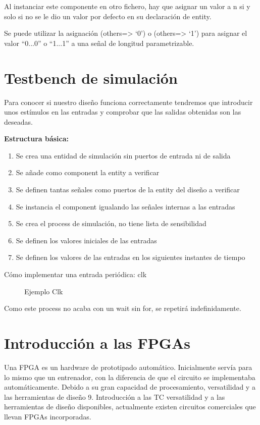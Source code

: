 Al instanciar este componente en otro fichero, hay que asignar un valor a n si y solo si no se le dio un valor por defecto en su declaración de entity.

Se  puede  utilizar  la  asignación (others=> ‘0’) o (others=> ‘1’) para asignar el valor “0...0” o “1...1” a una señal de longitud parametrizable.

\section{Testbench de simulación}
Para conocer si nuestro diseño funciona correctamente tendremos que introducir unos estímulos en las entradas y comprobar que las salidas obtenidas son las deseadas.

\textbf{Estructura básica:}
\begin{enumerate}
	\item Se crea una entidad de simulación sin puertos de entrada ni de salida
	\item Se añade como component la entity a verificar
	\item Se definen tantas señales como puertos de la entity del diseño a verificar
	\item Se instancia el component igualando las señales internas a las entradas
	\item Se crea el process de simulación, no tiene lista de sensibilidad
	\item Se definen los valores iniciales de las entradas
	\item Se definen los valores de las entradas en los siguientes instantes de tiempo
\end{enumerate}

Cómo implementar una entrada periódica: clk
\begin{figure}[H]
	\centering
	
	\caption{Ejemplo Clk}
\end{figure}

Como este process no acaba con un wait sin for, se repetirá indefinidamente.


\section{Introducción a las FPGAs}
Una FPGA es un hardware de prototipado automático. Inicialmente servía para lo mismo que un entrenador, con la diferencia de que el circuito se implementaba automáticamente. Debido a su gran capacidad de procesamiento, versatilidad y a las herramientas de diseño 9. Introducción a las TC versatilidad y a las herramientas de diseño disponibles, actualmente existen circuitos comerciales que llevan FPGAs incorporadas.

